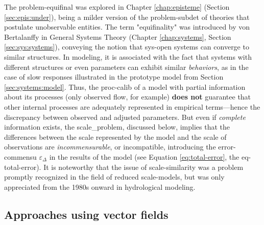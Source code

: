 \documentclass[./main_en.tex]{subfiles}
\begin{document}
\par The \gls{problem-equifinal} was explored in Chapter \ref{chap:episteme} (Section \ref{sec:epis:under}), being a milder version of the \gls{problem-subdet} of theories that postulate unobservable entities. The term "equifinality" was introduced by von Bertalanffy in General Systems Theory (Chapter \ref{chap:systems}, Section \ref{sec:sys:systems}), conveying the notion that \gls{sys-open} systems can converge to similar structures. In modeling, it is associated with the fact that systems with different structures or even \gls{parameters} can exhibit similar \textit{behaviors}, as in the case of slow responses illustrated in the prototype \gls{model} from Section \ref{sec:systems:model}. Thus, the \gls{proc-calib} of a \gls{model} with partial information about its processes (only observed flow, for example) \textbf{does not} guarantee that other internal processes are adequately represented in empirical terms—hence the discrepancy between observed and adjusted \gls{parameters}. But even if \textit{complete} information exists, the \gls{scale_problem}, discussed below, implies that the differences between the scale represented by the \gls{model} and the scale of observations are \textit{incommensurable}, or incompatible, introducing the \gls{error-commensu} $\varepsilon_{\Delta}$ in the results of the \gls{model} (see Equation \eqref{eq:total-error}, the \gls{eq-total-error}). It is noteworthy that the issue of \gls{scale-similarity} was a problem promptly recognized in the field of reduced \gls{scale-models}, but was only appreciated from the 1980s onward in hydrological modeling.

\subsection{Approaches using vector fields} \label{sec:hydro:physical}
\end{document}
